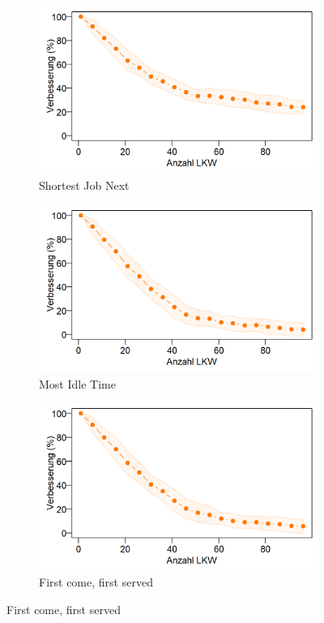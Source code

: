 \begin{figure}[H]
\centering
\begin{subfigure}{.495\textwidth}
  \centering
  \includegraphics[width=\linewidth]{images/graphs/rsNumberOfTrucksSjn_Wartezeit.png}
  \caption{Shortest Job Next}
  \label{fig:ew1}
\end{subfigure}
\begin{subfigure}{.495\textwidth}
  \centering
  \includegraphics[width=\linewidth]{images/graphs/rsNumberOfTrucksMot_Wartezeit.png}
  \caption{Most Idle Time}
  \label{fig:ew2}
\end{subfigure}

\begin{subfigure}{.5\textwidth}
  \centering
  \includegraphics[width=\linewidth]{images/graphs/rsNumberOfTrucksFcfs_Wartezeit.png}
  \caption{First come, first served}
  \label{fig:ew3}
\end{subfigure}


\end{figure}
